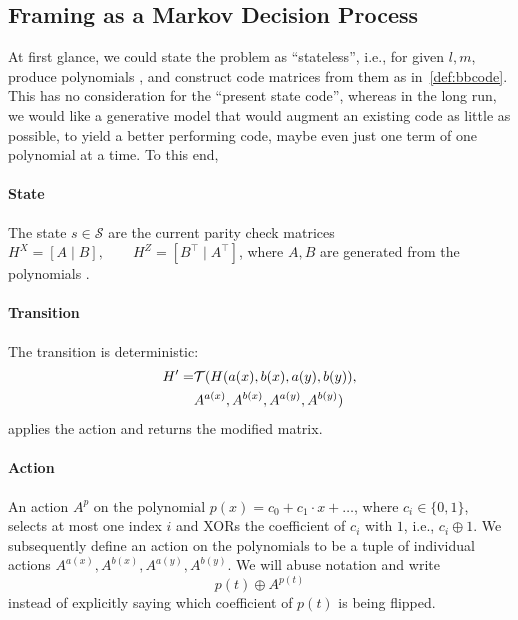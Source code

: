 \subsection{Framing as a Markov Decision Process}
At first glance, we could state the problem as ``stateless'', i.e.,  
for given \(l,m\), produce polynomials \polynomials{}, and construct code matrices from them as in~\ref{def:bbcode}.
This has no consideration for the ``present state code'', whereas in the long run, 
we would like a generative model that would augment an existing code as little as possible, to yield a better performing code, maybe even just one term of one polynomial at a time.
To this end, 
\paragraph{State} The state \(s \in \mathcal{S}\) are the current parity check matrices  
\(H^X = [A \mid B], \qquad H^Z = [B^\top \mid A^\top]\), where \(A,B\) are generated from the polynomials \polynomials{}.

\paragraph{Transition} The transition is deterministic:
\begin{equation}
    \begin{split}
    H' =& \mathcal{T}(H(a(x), b(x), a(y), b(y){}),\\
        &A^{a(x)},A^{b(x)},A^{a(y)},A^{b(y)})
    \end{split}
\end{equation}
 applies the action and returns the modified matrix.

\paragraph{Action} An action \(A^p\) on the polynomial \(p(x) = c_0 + c_1 \cdot x + \ldots\), where \(c_i \in \{0,1\}\), selects at most one index \(i\) and XORs the coefficient of \(c_i\) with \(1\), i.e., \(c_i \oplus 1\).
We subsequently define an action on the polynomials \polynomials{} to be a tuple of individual actions \(A^{a(x)},A^{b(x)},A^{a(y)},A^{b(y)}\). We will abuse notation and write 
\begin{equation}
    p(t)\oplus A^{p(t)}
\end{equation}
instead of explicitly saying which coefficient of \(p(t)\) is being flipped.

